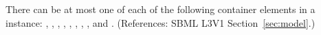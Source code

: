 There can be at most one of each of the following container elements in a
\Model instance: \ListOfFunctionDefinitions, \ListOfUnitDefinitions,
\ListOfCompartments, \ListOfSpecies, \ListOfParameters,
\ListOfInitialAssignments, \ListOfRules, \ListOfConstraints,
\ListOfReactions and \ListOfEvents.  (References: SBML L3V1
Section~\ref{sec:model}.)
